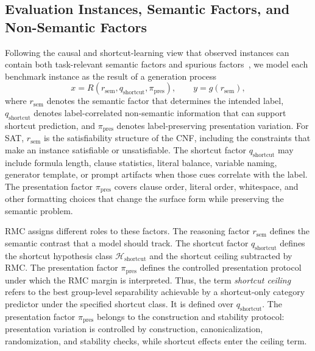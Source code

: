 \documentclass[conference]{IEEEtran}
\theoremstyle{remark}
\newcommand{\shortcutHypCls}{\mathcal{H}_{\mathrm{shortcut}}}
\newcommand{\reasonFac}{r_{\mathrm{sem}}}
\newcommand{\shortcutFac}{q_{\mathrm{shortcut}}}
\newcommand{\presentationFac}{\pi_{\mathrm{pres}}}
\begin{document}
\subsection{Evaluation Instances, Semantic Factors, and Non-Semantic Factors}
\label{sec:factor}

Following the causal and shortcut-learning view that observed instances can contain both task-relevant semantic factors and spurious factors~\cite{pearl2009causality,arjovsky2019invariant,geirhos2020shortcut,damour2022underspecification}, we model each benchmark instance as the result of a generation process
\begin{equation}\label{eq:formula-01}
x = R(\reasonFac, \shortcutFac, \presentationFac), \qquad y = g(\reasonFac),
\end{equation}
where $\reasonFac$ denotes the semantic factor that determines the intended label, $\shortcutFac$ denotes label-correlated non-semantic information that can support shortcut prediction, and $\presentationFac$ denotes label-preserving presentation variation.  For SAT, $\reasonFac$ is the satisfiability structure of the CNF, including the constraints that make an instance satisfiable or unsatisfiable.  The shortcut factor $\shortcutFac$ may include formula length, clause statistics, literal balance, variable naming, generator template, or prompt artifacts when those cues correlate with the label.  The presentation factor $\presentationFac$ covers clause order, literal order, whitespace, and other formatting choices that change the surface form while preserving the semantic problem.

RMC assigns different roles to these factors.  The reasoning factor $\reasonFac$ defines the semantic contrast that a model should track.  The shortcut factor $\shortcutFac$ defines the shortcut hypothesis class $\shortcutHypCls$ and the shortcut ceiling subtracted by RMC.  The presentation factor $\presentationFac$ defines the controlled presentation protocol under which the RMC margin is interpreted.  Thus, the term \emph{shortcut ceiling} refers to the best group-level separability achievable by a shortcut-only category predictor under the specified shortcut class.  It is defined over $\shortcutFac$.  The presentation factor $\presentationFac$ belongs to the construction and stability protocol: presentation variation is controlled by construction, canonicalization, randomization, and stability checks, while shortcut effects enter the ceiling term.
\end{document}
